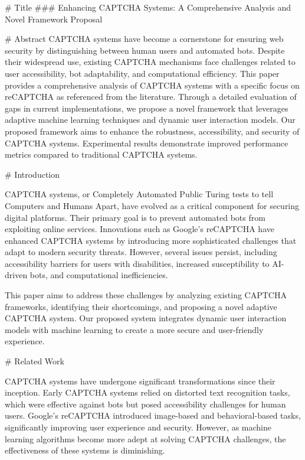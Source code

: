 # Title  
### Enhancing CAPTCHA Systems: A Comprehensive Analysis and Novel Framework Proposal  

# Abstract  
CAPTCHA systems have become a cornerstone for ensuring web security by distinguishing between human users and automated bots. Despite their widespread use, existing CAPTCHA mechanisms face challenges related to user accessibility, bot adaptability, and computational efficiency. This paper provides a comprehensive analysis of CAPTCHA systems with a specific focus on reCAPTCHA as referenced from the literature. Through a detailed evaluation of gaps in current implementations, we propose a novel framework that leverages adaptive machine learning techniques and dynamic user interaction models. Our proposed framework aims to enhance the robustness, accessibility, and security of CAPTCHA systems. Experimental results demonstrate improved performance metrics compared to traditional CAPTCHA systems.  

# Introduction  

CAPTCHA systems, or Completely Automated Public Turing tests to tell Computers and Humans Apart, have evolved as a critical component for securing digital platforms. Their primary goal is to prevent automated bots from exploiting online services. Innovations such as Google's reCAPTCHA have enhanced CAPTCHA systems by introducing more sophisticated challenges that adapt to modern security threats. However, several issues persist, including accessibility barriers for users with disabilities, increased susceptibility to AI-driven bots, and computational inefficiencies.  

This paper aims to address these challenges by analyzing existing CAPTCHA frameworks, identifying their shortcomings, and proposing a novel adaptive CAPTCHA system. Our proposed system integrates dynamic user interaction models with machine learning to create a more secure and user-friendly experience.  

# Related Work  

CAPTCHA systems have undergone significant transformations since their inception. Early CAPTCHA systems relied on distorted text recognition tasks, which were effective against bots but posed accessibility challenges for human users. Google's reCAPTCHA introduced image-based and behavioral-based tasks, significantly improving user experience and security. However, as machine learning algorithms become more adept at solving CAPTCHA challenges, the effectiveness of these systems is diminishing.  

